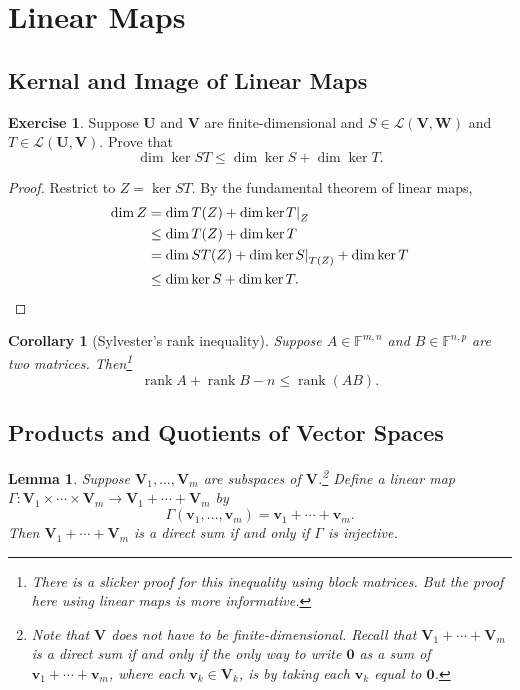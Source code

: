 \documentclass{tufte-handout}
\def \v {\vspace{0.2cm}}
\theoremstyle{plain} %
\newtheorem{cor}[thm]{Corollary}
\newtheorem{lem}[thm]{Lemma}
\theoremstyle{definition}
\newtheorem{exer}[thm]{Exercise}
\theoremstyle{remark}
\newcommand{\bra}[1]{\mathopen{}\left(#1\right)}
\newcommand{\rest}[2]{\mathopen{}\left.#1\right|_{#2}}
\newcommand{\F}{\mathbb{F}}
\newcommand{\mL}{\mathcal{L}}
\newcommand{\zero}{\mathbf{0}}
\newcommand{\U}{\bm{U}}
\newcommand{\V}{\bm{V}}
\newcommand{\W}{\bm{W}}
\renewcommand{\v}{\bm{v}}
\DeclareMathOperator{\rank}{rank}
\begin{document}
\section{Linear Maps}
\subsection{Kernal and Image of Linear Maps}
\begin{exer}
	Suppose $\U$ and $\V$ are finite-dimensional and $S\in\mL\bra{\V,\W}$ and $T\in\mL\bra{\U,\V}$. Prove that
	\[\dim\ker ST \leq \dim\ker S + \dim\ker T.\]
\end{exer}
\begin{proof}
	Restrict to $Z=\ker ST$. By the fundamental theorem of linear maps,
	\begin{align*}
		\dim Z & = \dim T(Z) + \dim\ker \rest{T}{Z} \\
		& \leq \dim T(Z) + \dim\ker T \\
		& = \dim ST(Z) + \dim\ker \rest{S}{T(Z)} + \dim\ker T \\
		& \leq \dim\ker S + \dim\ker T.\qedhere
	\end{align*}
\end{proof}

\begin{cor}[Sylvester's rank inequality]
	Suppose $A\in\F^{m,n}$ and $B\in\F^{n,p}$ are two matrices. Then\footnote{There is a slicker proof for this inequality using block matrices. But the proof here using linear maps is more informative.}
	\[\rank A+\rank B-n\leq\rank\bra{AB}.\]
\end{cor}

\subsection{Products and Quotients of Vector Spaces}
\begin{lem}\label{lem: direct sum and product space}
	Suppose $\V_1,\dots,\V_m$ are subspaces of $\V$.\footnote{Note that $\V$ does not have to be finite-dimensional. Recall that $\V_1+\cdots+\V_m$ is a direct sum if and only if the only way to write $\zero$ as a sum of $\v_1+\cdots+\v_m$, where each $\v_k\in\V_k$, is by taking each $\v_k$ equal to $\zero$.} Define a linear map $\Gamma: \V_1\times\cdots\times\V_m \to \V_1+\cdots+\V_m$ by
	\[\Gamma\bra{\v_1,\dots,\v_m} = \v_1+\cdots+\v_m.\]
	Then $\V_1+\cdots+\V_m$ is a direct sum if and only if $\Gamma$ is injective.
\end{lem}
\end{document}
